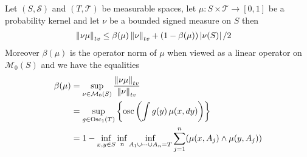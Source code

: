\begin{prop}\label{TotalVariationContractionBound}Let $(S, \mathcal{S})$ and $(T, \mathcal{T})$ be measurable spaces, let $\mu : S
\times \mathcal{T} \to [0,1]$ be a probability kernel and let $\nu$ be a bounded signed measure on $S$ then 
\begin{align*}
\left \lVert  \nu \mu \right \rVert_{tv} &\leq \beta(\mu) \left \lVert  \nu \right \rVert_{tv} + (1 - \beta(\mu)) \left \vert \nu(S) \right \vert/2
\end{align*}
Moreover $\beta(\mu)$ is the operator norm of $\mu$ when viewed as a linear operator on $\mathcal{M}_0(S)$ and we have the equalities
\begin{align*}
\beta(\mu) &= \sup_{\nu \in \mathcal{M}_0(S) } \frac{\tvnorm{\nu \mu}}{\tvnorm{\nu}} \\
&= \sup_{g \in \Osc1(T)} \left \lbrace \osc \left( \int g(y) \, \mu(x, dy) \right) \right \rbrace \\
&=1 - \inf_{x, y \in S}  \inf_n \inf_{A_1 \cup \dotsb \cup A_n = T} \sum_{j=1}^n (\mu(x, A_j) \minop \mu(y, A_j))
\end{align*}
\end{prop}
